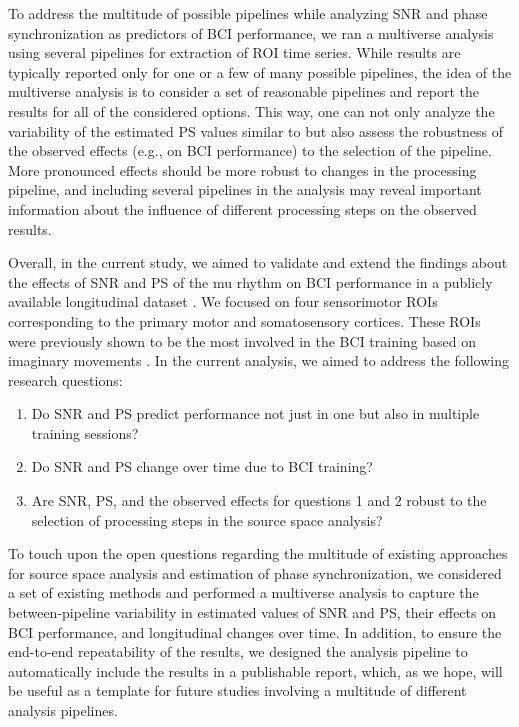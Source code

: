 To address the multitude of possible pipelines while analyzing SNR and phase synchronization as predictors of BCI performance, we ran a multiverse analysis \citep{Steegen2016} using several pipelines for extraction of ROI time series. While results are typically reported only for one or a few of many possible pipelines, the idea of the multiverse analysis is to consider a set of reasonable pipelines and report the results for all of the considered options. This way, one can not only analyze the variability of the estimated PS values similar to \cite{Mahjoory2017} but also assess the robustness of the observed effects (e.g., on BCI performance) to the selection of the pipeline. More pronounced effects should be more robust to changes in the processing pipeline, and including several pipelines in the analysis may reveal important information about the influence of different processing steps on the observed results.

\medskip

Overall, in the current study, we aimed to validate and extend the findings about the effects of SNR and PS of the mu rhythm on BCI performance in a publicly available longitudinal dataset \citep{Stieger2021_dataset}. We focused on four sensorimotor ROIs corresponding to the primary motor and somatosensory cortices. These ROIs were previously shown to be the most involved in the BCI training based on imaginary movements \citep{Samek2016, Vidaurre2020, Nierhaus2021}. In the current analysis, we aimed to address the following research questions:

\begin{enumerate}
    \item Do SNR and PS predict performance not just in one but also in multiple training sessions?
    \item Do SNR and PS change over time due to BCI training?
    \item Are SNR, PS, and the observed effects for questions 1 and 2 robust to the selection of processing steps in the source space analysis?
\end{enumerate}

To touch upon the open questions regarding the multitude of existing approaches for source space analysis and estimation of phase synchronization, we considered a set of existing methods and performed a multiverse analysis to capture the between-pipeline variability in estimated values of SNR and PS, their effects on BCI performance, and longitudinal changes over time. In addition, to ensure the end-to-end repeatability of the results, we designed the analysis pipeline to automatically include the results in a publishable report, which, as we hope, will be useful as a template for future studies involving a multitude of different analysis pipelines.
